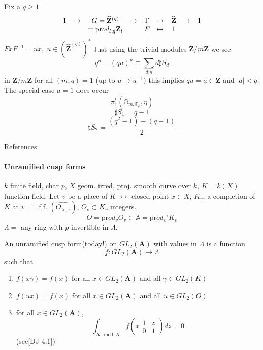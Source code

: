 \begin{example}
	Fix a $q\geq 1$
		$$\begin{array}{cccccccccccccccc}
		1&\to &G=\widehat{\mathbf{Z}}^{(q)}&\to &\Gamma&\to &
		\widehat{\mathbf{Z}} &\to &1\\
		& &= \text{pr}od_{l\not \mid q}\mathbf{Z}_l & & F & \mapsto & 1
		\end{array}$$
	$FxF^{-1}=ux, \; u\in (\widehat{\mathbf{Z}}^{(q)})^*$ Just using the trivial modules $\mathbf{Z}/m\mathbf{Z}$ we see
		$$q^n-(qu)^n\equiv \sum_{d|n} d\sharp S_d$$
		in $\mathbf{Z}/m\mathbf{Z}$ for all $(m, q)=1$ (up to $u\to u^{-1}$) this implies $qu=a\in \mathbf{Z}$ and $|a|<q$. The special case $a=1$ does occur 
		$$\pi_1^t(\mathbb G_{m, \mathbb F_p}, \overline \eta)$$
		$$\sharp S_1 = q-1$$
		$$\sharp S_2 = \frac{(q^2-1)-(q-1)}{2}$$


		
\end{example}


References:\\

\paragraph{Unramified cusp forms} $k$ finite field, char $p$, $X$ geom. irred, proj. smooth curve over $k$, $K=k(X)$ function field. Let $v$ be a place of $K$ $\leftrightarrow$ closed point $x\in X$, $K_v$, a completion of $K$ at $v$ $=$ f.f. $(\widehat{O_{X, x}})$, $O_v\subset K_v$ integers. 
	$$O=\text{pr}od_v O_v\subset \mathbb A=\text{pr}od_v'K_v$$
	$\Lambda=$ any ring with $p$ invertible in $\Lambda$. 

\begin{definition} An unramified cusp form(today!) on $GL_2(\mathbf{A})$ with values in $\Lambda$ is a function
	$$f: GL_2(\mathbf{A})\to \Lambda$$
	such that
	\begin{enumerate}
	\item $f(x\gamma) = f(x)$ for all $x\in GL_2(\mathbf{A})$ and all $\gamma\in GL_2(K)$
	\item $f(ux) = f(x)$ for all $x\in GL_2(\mathbf{A})$ and all $u\in GL_2(O)$
	\item for all $x\in GL_2(\mathbf{A})$, 
	$$\int_{\mathbf{A} \mod K}f\left(x\begin{matrix}1 & z\\ 0 & 1\end{matrix} \right)dz=0$$
	(see[DJ 4.1])
	\end{enumerate}
\end{definition}

